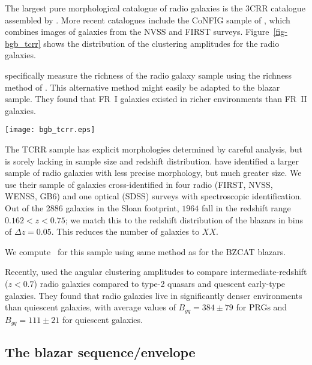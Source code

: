 \documentclass[useAMS,usenatbib]{mn2e}
\begin{document}
The largest pure morphological catalogue of radio galaxies is the 3CRR catalogue assembled by \citet{lai83}. More recent catalogues include the CoNFIG sample of \citet{gen08}, which combines images of galaxies from the NVSS and FIRST surveys.  Figure~\ref{fig-bgb_tcrr} shows the distribution of the clustering amplitudes for the radio galaxies. 

\citet{gen13} specifically measure the richness of the radio galaxy sample using the richness method of \citet{win11}. This alternative method might easily be adapted to the blazar sample. They found that FR~I galaxies existed in richer environments than FR~II galaxies.

\begin{figure*}
\texttt{[image: bgb\_tcrr.eps]}
\caption{Top left: Distribution of the \bgb~clustering amplitudes for the radio galaxies in the 3CRR catalog. Top right: Distribution of \bgb~for FR~I and FR~II sub-populations. Bottom left: \bgb~as a function of the galaxy redshift. Bottom right: \bgb~as a function of redshift, color-coded by morphological type. 
\label{fig-bgb_tcrr}}
\end{figure*}

The TCRR sample has explicit morphologies determined by careful analysis, but is sorely lacking in sample size and redshift distribution. \citet{kim08} have identified a larger sample of radio galaxies with less precise morphology, but much greater size. We use their sample of galaxies cross-identified in four radio (FIRST, NVSS, WENSS, GB6) and one optical (SDSS) surveys with spectroscopic identification. Out of the 2886 galaxies in the Sloan footprint, $1964$ fall in the redshift range $0.162<z<0.75$; we match this to the redshift distribution of the blazars in bins of $\Delta z=0.05$. This reduces the number of galaxies to $XX$. 

We compute \bgb~for this sample using same method as for the BZCAT blazars. 

Recently, \citet{ram13} used the angular clustering amplitudes to compare intermediate-redshift ($z<0.7$) radio galaxies compared to type-2 quasars and quescent early-type galaxies. They found that radio galaxies live in significantly denser environments than quiescent galaxies, with average values of $B_{gq}=384\pm79$ for PRGs and $B_{gq}=111\pm21$ for quiescent galaxies.

\subsection{The blazar sequence/envelope}\label{ssec-sequence}
\end{document}
